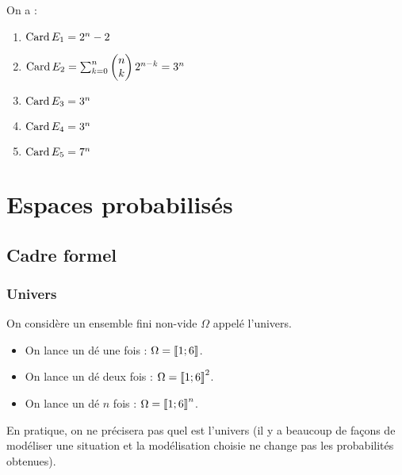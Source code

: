 \begin{corr}
On a :

\begin{enumerate}
    \item \(\Card E_1=2^n-2\) \\
    \item \(\Card E_2=\sum_{k=0}^{n}\binom{k}{n}2^{n-k}=3^n\) \\
    \item \(\Card E_3=3^n\) \\
    \item \(\Card E_4=3^n\) \\
    \item \(\Card E_5=7^n\)
\end{enumerate}
\end{corr}

\section{Espaces probabilisés}

\subsection{Cadre formel}

\subsubsection{Univers}

On considère un ensemble fini non-vide \(\Omega\) appelé l'univers.

\begin{ex}
\begin{itemize}
    \item On lance un dé une fois : \(\Omega=\interventierii{1}{6}\). \\
    \item On lance un dé deux fois : \(\Omega=\interventierii{1}{6}^2\). \\
    \item On lance un dé \(n\) fois : \(\Omega=\interventierii{1}{6}^n\).
\end{itemize}
\end{ex}

\begin{rem}
En pratique, on ne précisera pas quel est l'univers (il y a beaucoup de façons de modéliser une situation et la modélisation choisie ne change pas les probabilités obtenues).
\end{rem}

